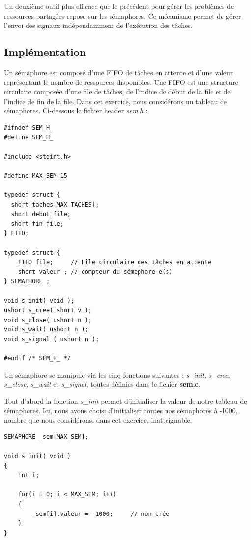 \documentclass[a4paper,12pt]{report}
\begin{document}
Un deuxième outil plus efficace que le précédent pour gérer les problèmes de ressources partagées repose sur les sémaphores. Ce mécanisme permet de gérer l'envoi des signaux indépendamment de l'exécution des tâches.

\subsection{Implémentation}

Un sémaphore est composé d'une FIFO de tâches en attente et d'une valeur représentant le nombre de ressources disponibles. Une FIFO est une structure circulaire composée d'une file de tâches, de l'indice de début de la file et de l'indice de fin de la file. Dans cet exercice, nous considérons un tableau de sémaphores. Ci-dessous le fichier header \textit{sem.h} :\newline

\begin{lstlisting}
#ifndef SEM_H_
#define SEM_H_

#include <stdint.h>

#define MAX_SEM 15

typedef struct {
  short taches[MAX_TACHES];
  short debut_file;	
  short fin_file;
} FIFO;

typedef struct {
	FIFO file;     // File circulaire des tâches en attente 
	short valeur ; // compteur du sémaphore e(s) 
} SEMAPHORE ;

void s_init( void );
ushort s_cree( short v );
void s_close( ushort n );
void s_wait( ushort n );
void s_signal ( ushort n );

#endif /* SEM_H_ */
\end{lstlisting}


Un sémaphore se manipule via les cinq fonctions suivantes : \textit{s\_init}, \textit{s\_cree}, \textit{s\_close}, \textit{s\_wait} et \textit{s\_signal}, toutes définies dans le fichier \textbf{sem.c}.\newline

Tout d'abord la fonction \textit{s\_init} permet d'initialiser la valeur de notre tableau de sémaphores. Ici, nous avons choisi d'initialiser toutes nos sémaphores à -1000, nombre que nous considérons, dans cet exercice, inatteignable.\newline

\begin{lstlisting}
SEMAPHORE _sem[MAX_SEM];

void s_init( void )
{
	int i;

	for(i = 0; i < MAX_SEM; i++)
	{
		_sem[i].valeur = -1000;		// non crée
	}
}
\end{lstlisting}
\end{document}
